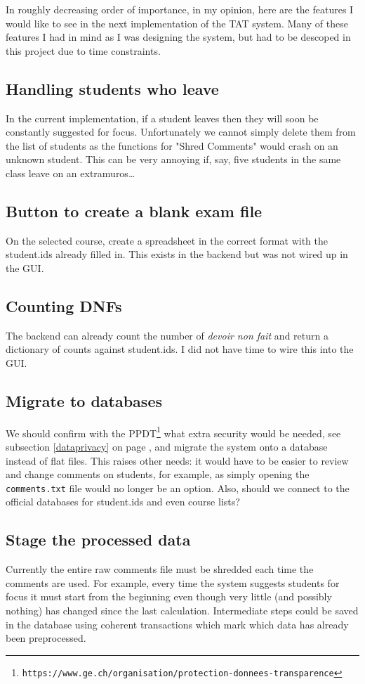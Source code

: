 \documentclass[10pt]{article}
\begin{document}
In roughly decreasing order of importance, in my opinion, here are the features I would like to see in the next implementation of the TAT system. Many of these features I had in mind as I was designing the system, but had to be descoped in this project due to time constraints.

\subsection{Handling students who leave}
In the current implementation, if a student leaves then they will soon be constantly suggested for focus. Unfortunately we cannot simply delete them from the list of students as the functions for "Shred Comments" would crash on an unknown student. This can be very annoying if, say, five students in the same class leave on an extramuros\ldots

\subsection{Button to create a blank exam file}
On the selected course, create a spreadsheet in the correct format with the student.ids already filled in. This exists in the backend but was not wired up in the GUI.

\subsection{Counting DNFs}
The backend can already count the number of \emph{devoir non fait} and return a dictionary of counts against student.ids. I did not have time to wire this into the GUI.

\subsection{Migrate to databases}
We should confirm with the PPDT\footnote{\texttt{https://www.ge.ch/organisation/protection-donnees-transparence}} what extra security would be needed, see subsection \ref{dataprivacy} on page \pageref{dataprivacy}, and migrate the system onto a database instead of flat files. This raises other needs: it would have to be easier to review and change comments on students, for example, as simply opening the \texttt{comments.txt} file would no longer be an option. Also, should we connect to the official databases for student.ids and even course lists?

\subsection{Stage the processed data}
Currently the entire raw comments file must be shredded each time the comments are used. For example, every time the system suggests students for focus it must start from the beginning even though very little (and possibly nothing) has changed since the last calculation. Intermediate steps could be saved in the database using coherent transactions which mark which data has already been preprocessed.
\end{document}
